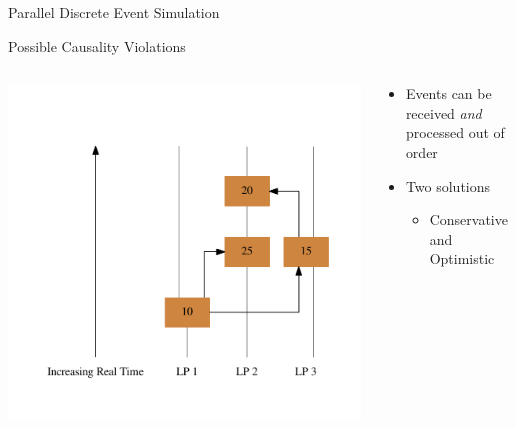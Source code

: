 \documentclass[10pt]{beamer}
\begin{document}
\begin{frame}{Parallel Discrete Event Simulation}
\begin{block}{Possible Causality Violations}
\begin{columns}[T]
        \begin{column}{0.4\textwidth}
            \includegraphics[width=\textwidth]{../figs/graphviz/causality.pdf}
        \end{column}

        \begin{column}{0.6\textwidth}
            \begin{itemize}
                \item Events can be received \emph{and} processed out of order
                \item Two solutions
                    \begin{itemize}
                        \item Conservative and Optimistic
                    \end{itemize}
            \end{itemize}
        \end{column}

        \end{columns}

    \end{block}

\end{frame}
\end{document}

